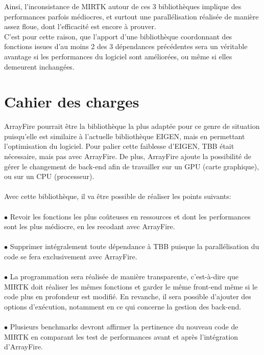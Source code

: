 \documentclass[10pt]{report}
\begin{document}
	Ainsi, l'inconsistance de MIRTK autour de ces 3 bibliothèques implique des performances parfois médiocres, et surtout une parallélisation réalisée de manière assez floue, dont l'efficacité est encore à prouver.  
	\\ C'est pour cette raison, que l'apport d'une bibliothèque coordonnant des fonctions issues d'au moins 2 des 3 dépendances précédentes sera un véritable avantage si les performances du logiciel sont améliorées, ou même si elles demeurent inchangées. 
		

	 \newpage

	\section{Cahier des charges}
	ArrayFire pourrait être la bibliothèque la plus adaptée pour ce genre de situation puisqu'elle est similaire à l'actuelle bibliothèque EIGEN, mais en permettant l'optimisation du logiciel. Pour palier cette faiblesse d'EIGEN, TBB était nécessaire, mais pas avec ArrayFire. De plus, ArrayFire ajoute la possibilité de gérer le changement de back-end afin de travailler sur un GPU (carte graphique), ou sur un CPU (processeur).\\
	\\
	Avec cette bibliothèque, il va être possible de réaliser les points suivants:\\ 
		\\{$\bullet$} Revoir les fonctions les plus coûteuses en ressources et dont les performances sont les plus médiocre, en les recodant avec ArrayFire.\\
		\\{$\bullet$} Supprimer intégralement toute dépendance à TBB puisque la parallélisation du code se fera exclusivement avec ArrayFire.\\
		\\{$\bullet$} La programmation sera réalisée de manière transparente, c'est-à-dire que MIRTK doit réaliser les mêmes fonctions et garder le même front-end même si le code plus en profondeur est modifié. En revanche, il sera possible d'ajouter des options d'exécution, notamment en ce qui concerne la gestion des back-end.\\
		\\{$\bullet$} Plusieurs benchmarks devront affirmer la pertinence du nouveau code de MIRTK en comparant les test de performances avant et après l'intégration d'ArrayFire.\\
\end{document}
